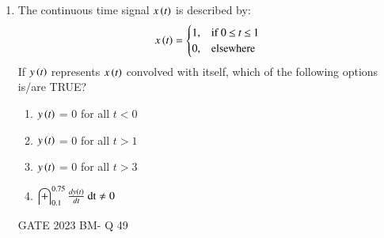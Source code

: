 \begin{enumerate}[label=\thechapter.\arabic*,ref=\thechapter.\theenumi]
\item The continuous time signal $x\left(t\right)$ is described by:
\begin{align}
x\left(t\right)=
    \begin{cases}
        1, & \text{if } 0\: {\displaystyle \leq }\:t\:{\displaystyle \leq }\:1\\
        0, & \text{elsewhere}
    \end{cases} 
\end{align}
If $y\left(t\right)$ represents $x\left(t\right)$ convolved with itself, which of the following options is/are TRUE?
\begin{enumerate}[label = (\Alph*)]
    \item $y\left(t\right)$ = 0 for all $t<0$ \label{gate.bm.49.a}\\
    \item $y\left(t\right)$ = 0 for all $t>1$ \label{gate.bm.49.b}\\
    \item $y\left(t\right)$ = 0 for all $t>3$ \label{gate.bm.49.c}\\
    \item $\int_{0.1}^{0.75} \frac{dy\left(t\right)}{dt}\: \text{dt} \neq 0$ \label{gate.bm.49.d}
\end{enumerate} \hfill{GATE 2023 BM- Q 49}\\

\newpage

\end{enumerate}
